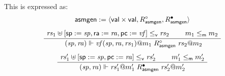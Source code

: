 \documentclass[sigplan,screen]{acmart}
\newcommand{\kw}[1]{\ensuremath{ \mathsf{#1} }}
\newcommand{\que}{\circ}
\newcommand{\ans}{\bullet}
\newcommand{\vref}{\le_\kw{v}}
\newcommand{\mext}{\le_\kw{m}}
\newenvironment{optional}{}{}
\begin{document}
\begin{optional}

This is expressed as:
\begin{gather*}
  \kw{asmgen} := \langle \kw{val} \times \kw{val},
    R_\kw{asmgen}^\que, R_\kw{asmgen}^\ans \rangle
  \\[1ex]
  \AxiomC{$\mathit{rs}_1 \uplus
    [\kw{sp} := \mathit{sp}, \kw{ra} := \mathit{ra}, \kw{pc} := \mathit{vf}]
    \vref \mathit{rs}_2$}
  \AxiomC{$m_1 \mext m_2$}
  \BinaryInfC{
    $(\mathit{sp}, \mathit{ra}) \Vdash
     \mathit{vf}(\mathit{sp}, \mathit{ra}, \mathit{rs}_1)@m_1
     \mathrel{R_\kw{asmgen}^\que}
     \mathit{rs}_2@m_2$}
  \DisplayProof
  \\[1ex]
  \AxiomC{$
    \mathit{rs}_1' \uplus [\kw{sp} := \mathit{sp}, \kw{pc} := \mathit{ra}]
    \vref \mathit{rs}_2'$}
  \AxiomC{$m_1' \mext m_2'$}
  \BinaryInfC{$
    (\mathit{sp}, \mathit{ra}) \Vdash \mathit{rs}_1'@m_1'
    \mathrel{R_\kw{asmgen}^\ans}
    \mathit{rs}_2'@m_2'$}
  \DisplayProof
\end{gather*}



\end{optional}
\end{document}
